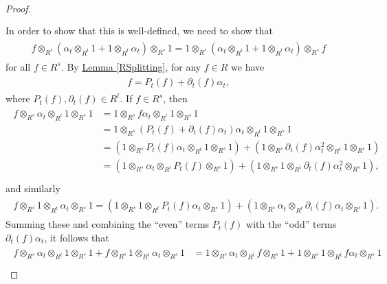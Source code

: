 \begin{proof}
\begin{align*}
\begin{split}
\end{split}
\end{align*}
\noindent In order to show that this is well-defined, we need to show that
\begin{align*}
\begin{split}
f \otimes_{R^s} (\alpha_t \otimes_{R^t} 1 + 1 \otimes_{R^t} \alpha_t) \otimes_{R^s} 1 = 1 \otimes_{R^s} (\alpha_t \otimes_{R^t} 1 + 1 \otimes_{R^t} \alpha_t) \otimes_{R^s} f
\end{split}
\end{align*}
\noindent for all $f \in R^s$. By \hyperref[RSplitting]{Lemma \ref*{RSplitting}}, for any $f \in R$ we have
\begin{align*}
\begin{split}
f = P_t(f) + \partial_t(f)\alpha_t,
\end{split}
\end{align*}
\noindent where $P_t(f), \partial_t(f) \in R^t$. If $f \in R^s$, then
\begin{align*}
\begin{split}
f \otimes_{R^s} \alpha_t \otimes_{R^t} 1 \otimes_{R^s} 1 &= 1 \otimes_{R^s} f\alpha_t \otimes_{R^t} 1 \otimes_{R^s} 1\\
&= 1 \otimes_{R^s} (P_t(f) + \partial_t(f)\alpha_t)\alpha_t \otimes_{R^t} 1 \otimes_{R^s} 1\\
&= (1 \otimes_{R^s} P_t(f)\alpha_t \otimes_{R^t} 1 \otimes_{R^s} 1) + (1 \otimes_{R^s} \partial_t(f)\alpha_t^2 \otimes_{R^t} 1 \otimes_{R^s} 1)\\
&= (1 \otimes_{R^s} \alpha_t \otimes_{R^t} P_t(f) \otimes_{R^s} 1) + (1 \otimes_{R^s} 1 \otimes_{R^t} \partial_t(f)\alpha_t^2 \otimes_{R^s} 1),\\
\end{split}
\end{align*}
\noindent and similarly
\begin{align*}
\begin{split}
f \otimes_{R^s} 1 \otimes_{R^t} \alpha_t \otimes_{R^s} 1 = (1 \otimes_{R^s} 1 \otimes_{R^t} P_t(f)\alpha_t \otimes_{R^s} 1) + (1 \otimes_{R^s} \alpha_t \otimes_{R^t} \partial_t(f)\alpha_t \otimes_{R^s} 1).
\end{split}
\end{align*}
\noindent Summing these and combining the ``even'' terms $P_t(f)$ with the ``odd'' terms $\partial_t(f)\alpha_t$, it follows that
\begin{align*}
\begin{split}
f \otimes_{R^s} \alpha_t \otimes_{R^t} 1 \otimes_{R^s} 1 + f \otimes_{R^s} 1 \otimes_{R^t} \alpha_t \otimes_{R^s} 1 &= 1 \otimes_{R^s} \alpha_t \otimes_{R^t} f \otimes_{R^s} 1 + 1 \otimes_{R^s} 1 \otimes_{R^t} f\alpha_t \otimes_{R^s} 1\\

\end{split}
\end{align*}
\end{proof}
